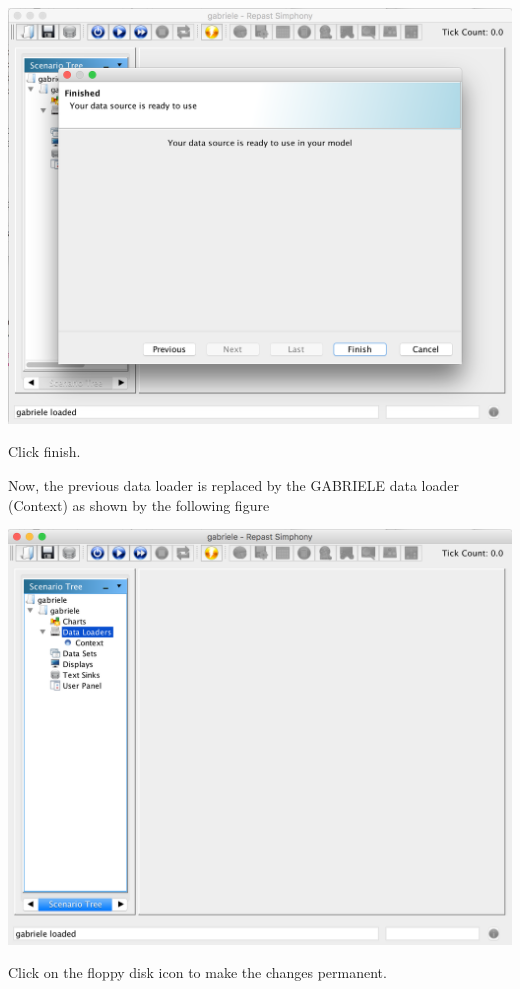 \documentclass{book}
\begin{document}
\noindent
\includegraphics[scale=0.35]{fig_gabriele_rs_gui5}

Click finish.

Now, the previous data loader is replaced by the GABRIELE data loader (Context) as shown by the following figure

\noindent
\includegraphics[scale=0.35]{fig_gabriele_rs_gui6}

Click on the floppy disk icon to make the changes permanent.

\end{document}
